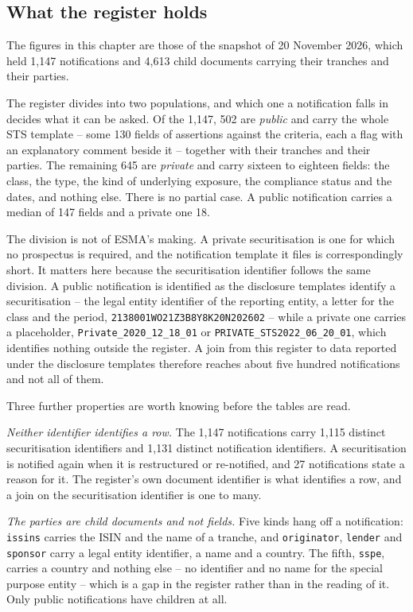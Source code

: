 \subsection{What the register holds}

\label{sec:sts-populations}
The figures in this chapter are those of the snapshot of 20 November 2026, which held 1{,}147 notifications and 4{,}613 child documents carrying their tranches and their parties.

The register divides into two populations, and which one a notification falls in decides what it can be asked. Of the 1{,}147, 502 are \emph{public} and carry the whole STS template -- some 130 fields of assertions against the criteria, each a flag with an explanatory comment beside it -- together with their tranches and their parties. The remaining 645 are \emph{private} and carry sixteen to eighteen fields: the class, the type, the kind of underlying exposure, the compliance status and the dates, and nothing else. There is no partial case. A public notification carries a median of 147 fields and a private one 18.

The division is not of ESMA's making. A private securitisation is one for which no prospectus is required, and the notification template it files is correspondingly short. It matters here because the securitisation identifier follows the same division. A public notification is identified as the disclosure templates identify a securitisation -- the legal entity identifier of the reporting entity, a letter for the class and the period, \verb|2138001WO21Z3B8Y8K20N202602| -- while a private one carries a placeholder, \verb|Private_2020_12_18_01| or \verb|PRIVATE_STS2022_06_20_01|, which identifies nothing outside the register. A join from this register to data reported under the disclosure templates therefore reaches about five hundred notifications and not all of them.

Three further properties are worth knowing before the tables are read.

\emph{Neither identifier identifies a row.} The 1{,}147 notifications carry 1{,}115 distinct securitisation identifiers and 1{,}131 distinct notification identifiers. A securitisation is notified again when it is restructured or re-notified, and 27 notifications state a reason for it. The register's own document identifier is what identifies a row, and a join on the securitisation identifier is one to many.

\emph{The parties are child documents and not fields.} Five kinds hang off a notification: \verb|issins| carries the ISIN and the name of a tranche, and \verb|originator|, \verb|lender| and \verb|sponsor| carry a legal entity identifier, a name and a country. The fifth, \verb|sspe|, carries a country and nothing else -- no identifier and no name for the special purpose entity -- which is a gap in the register rather than in the reading of it. Only public notifications have children at all.

